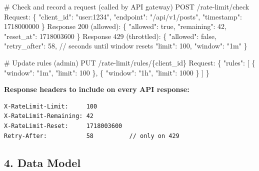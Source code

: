\documentclass[11pt]{article}
\newenvironment{Shaded}{\begin{snugshade}}{\end{snugshade}}
\newcommand{\CommentTok}[1]{\textcolor[rgb]{0.48,0.49,0.49}{#1}}
\newcommand{\DecValTok}[1]{\textcolor[rgb]{0.96,0.45,0.00}{#1}}
\newcommand{\NormalTok}[1]{\textcolor[rgb]{0.81,0.81,0.76}{#1}}
\newcommand{\OperatorTok}[1]{\textcolor[rgb]{0.81,0.81,0.76}{#1}}
\newcommand{\StringTok}[1]{\textcolor[rgb]{0.96,0.31,0.31}{#1}}
\begin{document}
\begin{Shaded}
\begin{Highlighting}[]
\CommentTok{\# Check and record a request (called by API gateway)}
\NormalTok{POST }\OperatorTok{/}\NormalTok{rate}\OperatorTok{{-}}\NormalTok{limit}\OperatorTok{/}\NormalTok{check}
\NormalTok{Request:}
\NormalTok{  \{}
    \StringTok{"client\_id"}\NormalTok{: }\StringTok{"user:1234"}\NormalTok{,}
    \StringTok{"endpoint"}\NormalTok{:  }\StringTok{"/api/v1/posts"}\NormalTok{,}
    \StringTok{"timestamp"}\NormalTok{: }\DecValTok{1718000000}
\NormalTok{  \}}
\NormalTok{Response }\DecValTok{200}\NormalTok{ (allowed):}
\NormalTok{  \{}
    \StringTok{"allowed"}\NormalTok{: true,}
    \StringTok{"remaining"}\NormalTok{: }\DecValTok{42}\NormalTok{,}
    \StringTok{"reset\_at"}\NormalTok{: }\DecValTok{1718003600}
\NormalTok{  \}}
\NormalTok{Response }\DecValTok{429}\NormalTok{ (throttled):}
\NormalTok{  \{}
    \StringTok{"allowed"}\NormalTok{: false,}
    \StringTok{"retry\_after"}\NormalTok{: }\DecValTok{58}\NormalTok{,       }\OperatorTok{//}\NormalTok{ seconds until window resets}
    \StringTok{"limit"}\NormalTok{: }\DecValTok{100}\NormalTok{,}
    \StringTok{"window"}\NormalTok{: }\StringTok{"1m"}
\NormalTok{  \}}

\CommentTok{\# Update rules (admin)}
\NormalTok{PUT }\OperatorTok{/}\NormalTok{rate}\OperatorTok{{-}}\NormalTok{limit}\OperatorTok{/}\NormalTok{rules}\OperatorTok{/}\NormalTok{\{client\_id\}}
\NormalTok{Request:}
\NormalTok{  \{}
    \StringTok{"rules"}\NormalTok{: [}
\NormalTok{      \{ }\StringTok{"window"}\NormalTok{: }\StringTok{"1m"}\NormalTok{, }\StringTok{"limit"}\NormalTok{: }\DecValTok{100}\NormalTok{ \},}
\NormalTok{      \{ }\StringTok{"window"}\NormalTok{: }\StringTok{"1h"}\NormalTok{, }\StringTok{"limit"}\NormalTok{: }\DecValTok{1000}\NormalTok{ \}}
\NormalTok{    ]}
\NormalTok{  \}}
\end{Highlighting}
\end{Shaded}

\textbf{Response headers to include on every API response:}

\setcodelang{}

\begin{verbatim}
X-RateLimit-Limit:     100
X-RateLimit-Remaining: 42
X-RateLimit-Reset:     1718003600
Retry-After:           58          // only on 429
\end{verbatim}

\subsection{4. Data Model}\label{4-data-model-1}
\end{document}
